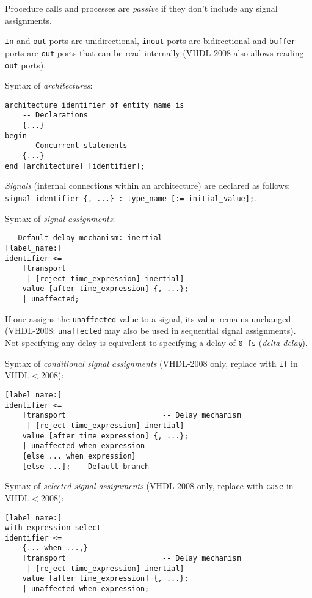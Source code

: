 \documentclass[fontsize=11pt,a4paper]{scrartcl}
\begin{document}
Procedure calls and processes are \emph{passive} if they don't include any signal assignments.

\lstinline!In! and \lstinline!out! ports are unidirectional, \lstinline!inout! ports are bidirectional and \lstinline!buffer! ports are \lstinline!out! ports that can be read internally (VHDL-2008 also allows reading \lstinline!out! ports).

Syntax of \emph{architectures}:
\begin{lstlisting}
architecture identifier of entity_name is
	-- Declarations
	{...}
begin
	-- Concurrent statements
	{...}
end [architecture] [identifier];
\end{lstlisting}

\emph{Signals} (internal connections within an architecture) are declared as follows:\\ \lstinline!signal identifier {, ...} : type_name [:= initial_value];!.

Syntax of \emph{signal assignments}:
\begin{lstlisting}
-- Default delay mechanism: inertial
[label_name:]
identifier <=
	[transport
	 | [reject time_expression] inertial]
	value [after time_expression] {, ...};
	| unaffected;
\end{lstlisting}

If one assigns the \lstinline!unaffected! value to a signal, its value remains unchanged (VHDL-2008: \lstinline!unaffected! may also be used in sequential signal assignments). Not specifying any delay is equivalent to specifying a delay of \lstinline!0 fs! (\emph{delta delay}).

Syntax of \emph{conditional signal assignments} (VHDL-2008 only, replace with \lstinline!if! in VHDL$<$2008):
\begin{lstlisting}
[label_name:]
identifier <=
	[transport                      -- Delay mechanism
	 | [reject time_expression] inertial]
	value [after time_expression] {, ...};
	| unaffected when expression
	{else ... when expression}
	[else ...]; -- Default branch
\end{lstlisting}

Syntax of \emph{selected signal assignments} (VHDL-2008 only, replace with \lstinline!case! in VHDL$<$2008):
\begin{lstlisting}
[label_name:]
with expression select
identifier <=
	{... when ...,}
	[transport                      -- Delay mechanism
	 | [reject time_expression] inertial]
	value [after time_expression] {, ...};
	| unaffected when expression;
\end{lstlisting}
\end{document}
